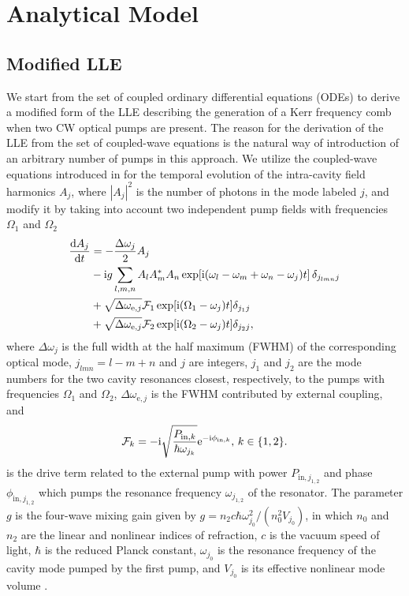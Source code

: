 \section{Analytical Model}
\label{sec:formulation}

\subsection{Modified LLE}

We start from the set of coupled ordinary differential equations (ODEs) to derive a modified form of the LLE describing the generation of a Kerr frequency comb when two CW optical pumps are present. The reason for the derivation of the LLE from the set of coupled-wave equations is the natural way of introduction of an arbitrary number of pumps in this approach. We utilize the coupled-wave equations introduced in \cite{chembo2010modal} for the temporal evolution of the intra-cavity field harmonics $A_j$, where $|A_j|^2$ is the number of photons in the mode labeled $j$, and modify it by taking into account two independent pump fields with frequencies $\Omega_1$ and $\Omega_2$
%
\begin{align}\label{eq:bichrom:ODE}
\frac{\mathrm{d}A_j}{\mathrm{d}t} &= -\frac{\Delta\omega_j}{2} A_j \nonumber \\
& -\mathrm{i} g \sum_{l, m, n} A_l A_m^* A_n \exp[\mathrm{i}(\omega_l -\omega_m +\omega_n - \omega_j)t] \, \delta_{j_{lmn}j} \nonumber \\
& + \sqrt{\Delta\omega_{\mathrm{e},j}}\mathcal{F}_1 \exp[\mathrm{i}(\Omega_{1}-\omega_j)t] \delta_{j_1 j} \nonumber \\
& + \sqrt{\Delta\omega_{\mathrm{e},j}}\mathcal{F}_2 \exp[\mathrm{i}(\Omega_{2}-\omega_j)t] \delta_{j_2 j},
\end{align}
%
where $\Delta\omega_j$ is the full width at the half maximum (FWHM) of the corresponding optical mode, $j_{lmn} = l - m + n$ and $j$ are integers, $j_1$ and $j_2$ are the mode numbers for the two cavity resonances closest, respectively, to the pumps with frequencies $\Omega_1$ and $\Omega_2$, $\Delta\omega_{\mathrm{e},j}$ is the FWHM contributed by external coupling, and
%
\begin{equation}\label{eq:bichrom:LLEdrive}
\mathcal{F}_{k} = -\mathrm{i} \sqrt{\frac{P_{\mathrm{in},k}}{\hbar\omega_{j_{k}}}} \mathrm{e}^{-\mathrm{i} \phi_{\mathrm{in},k}}, \, k \in \{ 1, 2 \}.
\end{equation}
%
is the drive term related to the external pump with power $P_{\mathrm{in},j_{1,2}}$ and phase $\phi_{\mathrm{in},j_{1,2}}$ which pumps the resonance frequency $\omega_{j_{1,2}}$ of the resonator. The parameter $g$ is the four-wave mixing gain given by $g = n_2 c \hbar \omega_{j_0}^2 / (n_0^2 V_{j_0})$, in which $n_0$ and $n_2$ are the linear and nonlinear indices of refraction, $c$ is the vacuum speed of light, $\hbar$ is the reduced Planck constant, $\omega_{j_0}$ is the resonance frequency of the cavity mode pumped by the first pump, and $V_{j_0}$ is its effective nonlinear mode volume \cite{matsko2005hyperparametric, chembo2010modal}.

